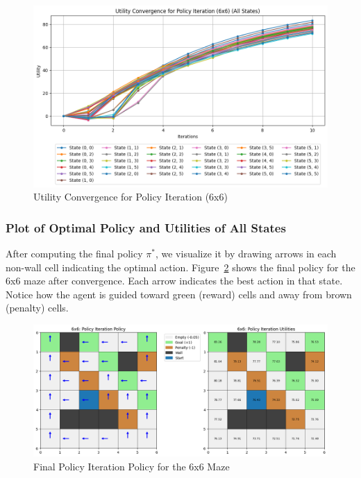 \documentclass[11pt]{article}
\begin{document}
\begin{figure}[H]
    \centering
    \includegraphics[width=\textwidth]{6x6_policy_iteration_convergence.png}
    \caption{Utility Convergence for Policy Iteration (6x6)}
    \label{fig:6x6_pi_convergence}
\end{figure}

\newpage
\subsubsection{Plot of Optimal Policy and Utilities of All States}
After computing the final policy $\pi^*$, we visualize it by drawing arrows in each non-wall cell indicating the optimal action. Figure~\ref{fig:6x6_pi_policy} shows the final policy for the 6x6 maze after convergence. Each arrow indicates the best action in that state. Notice how the agent is guided toward green (reward) cells and away from brown (penalty) cells.

\begin{figure}[H]
    \centering
    \includegraphics[width=\textwidth]{6x6_policy_iteration.png}
    \caption{Final Policy Iteration Policy for the 6x6 Maze}
    \label{fig:6x6_pi_policy}
\end{figure}
\end{document}
